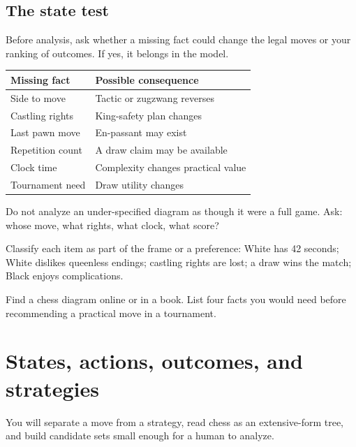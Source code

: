 \section{The state test}
Before analysis, ask whether a missing fact could change the legal moves or your ranking of outcomes. If yes, it belongs in the model.

\begin{center}
\begin{tabularx}{.9\textwidth}{YY}
\toprule
\textbf{Missing fact} & \textbf{Possible consequence}\\
\midrule
Side to move & Tactic or zugzwang reverses\\
Castling rights & King-safety plan changes\\
Last pawn move & En-passant may exist\\
Repetition count & A draw claim may be available\\
Clock time & Complexity changes practical value\\
Tournament need & Draw utility changes\\
\bottomrule
\end{tabularx}
\end{center}

\begin{warningbox}
Do not analyze an under-specified diagram as though it were a full game. Ask: whose move, what rights, what clock, what score?
\end{warningbox}

\begin{exercise}
Classify each item as part of the frame or a preference: White has 42 seconds; White dislikes queenless endings; castling rights are lost; a draw wins the match; Black enjoys complications.
\end{exercise}

\begin{exercise}
Find a chess diagram online or in a book. List four facts you would need before recommending a practical move in a tournament.
\end{exercise}


\chapter{States, actions, outcomes, and strategies}
\begin{learningbox}
You will separate a move from a strategy, read chess as an extensive-form tree, and build candidate sets small enough for a human to analyze.
\end{learningbox}

